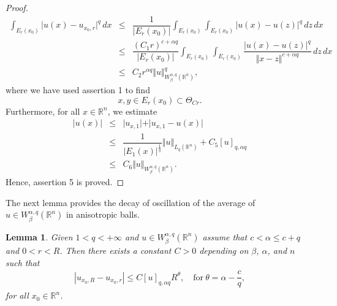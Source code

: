 \documentclass[10pt, leqno]{article}
\newtheorem{lemma}[theorem]{Lemma}
\theoremstyle{definition}
\theoremstyle{remark}
\numberwithin{equation}{section}
\begin{document}
\begin{proof}
\begin{eqnarray}
\label{}
\int_{E_{r}(x_{0})}\vert u(x) - u_{x_{0}, r} \vert^{q} \, dx & \leq & \displaystyle \dfrac{1}{\left | E_{r}(x_{0}) \right |}\int_{E_{r}(x_{0})} \int_{E_{r}(x_{0})} \left| u(x) - u(z) \right |^{q} \, dz \,dx \\ \nonumber
& \leq & \displaystyle \dfrac{(C_{1}r)^{c + \alpha q}}{\left | E_{r}(x_{0}) \right |}\int_{E_{r}(x_{0})} \int_{E_{r}(x_{0})}\dfrac{\left| u(x) - u(z) \right |^{q}}{\Vert x - z \Vert^{c + \alpha q}} \, dz \,dx \\ \nonumber
& \leq & \displaystyle C_{2}r^{\alpha q} \Vert u \Vert^q_{W_{\beta}^{\alpha, q}(\mathbb{R}^{n})},
\end{eqnarray}
where we have used assertion 1 to find
$$
x, y \in E_{r}(x_{0}) \subset \Theta_{Cr}.
$$
Furthermore, for all $x \in \mathbb{R}^{n}$, we estimate
\begin{eqnarray}
\label{elementary lemma 5}
\vert u(x) \vert & \leq & \vert u_{x,1} \vert + \vert u_{x,1} - u(x) \vert \\ \nonumber
&\leq & \dfrac{1}{\vert E_{1}(x)\vert^{\frac{1}{q}}} \Vert u \Vert_{L_{q}(\mathbb{R}^{n})} + C_{5} \left[ u\right]_{q, \alpha q}\\ \nonumber
&\leq & C_{6} \Vert u \Vert_{W_{\beta}^{\alpha, q}(\mathbb{R}^{n})}.
\end{eqnarray}
Hence, assertion 5 is proved.
\end{proof}

The next lemma provides the decay of oscillation of the average of $u \in W_{\beta}^{\alpha, q}(\mathbb{R}^{n})$ in anisotropic balls.

\begin{lemma}
\label{decay of average lemma}
Given $1 < q < +\infty$ and $u \in W_{\beta}^{\alpha, q}(\mathbb{R}^{n})$ assume that $c < \alpha \leq c + q$ and $0 < r < R$. Then there exists a constant $C> 0$ depending on $\beta$, $\alpha$, and $n$ such that
\begin{eqnarray}
\label{decay of average lemma 1}
\left | u_{x_{0},R} - u_{x_{0},r} \right | \leq C \left[ u \right]_{q, \alpha q} R^{\theta}, \quad \text{for} \ \theta = \alpha - \dfrac{c}{q},
\end{eqnarray}
for all $x_{0} \in \mathbb{R}^{n}$.
\end{lemma}
\end{document}
